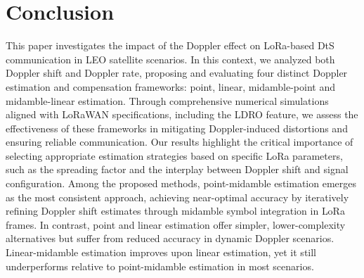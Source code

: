 \documentclass{IEEEtran}
\begin{document}
\section{Conclusion} \label{sec:final_comments}

This paper investigates the impact of the Doppler effect on \ac{LoRa}-based \ac{DtS} communication in LEO satellite scenarios. In this context, we analyzed both Doppler shift and Doppler rate, proposing and evaluating four distinct Doppler estimation and compensation frameworks: point, linear, midamble-point and midamble-linear estimation. Through comprehensive numerical simulations aligned with \ac{LoRaWAN} specifications, including the \ac{LDRO} feature, we assess the effectiveness of these frameworks in mitigating Doppler-induced distortions and ensuring reliable communication. Our results highlight the critical importance of selecting appropriate estimation strategies based on specific \ac{LoRa} parameters, such as the spreading factor and the interplay between Doppler shift and signal configuration. Among the proposed methods, point-midamble estimation emerges as the most consistent approach, achieving near-optimal accuracy by iteratively refining Doppler shift estimates through midamble symbol integration in \ac{LoRa} frames. In contrast, point and linear estimation offer simpler, lower-complexity alternatives but suffer from reduced accuracy in dynamic Doppler scenarios. Linear-midamble estimation improves upon linear estimation, yet it still underperforms relative to point-midamble estimation in most scenarios.


\balance

\end{document}
